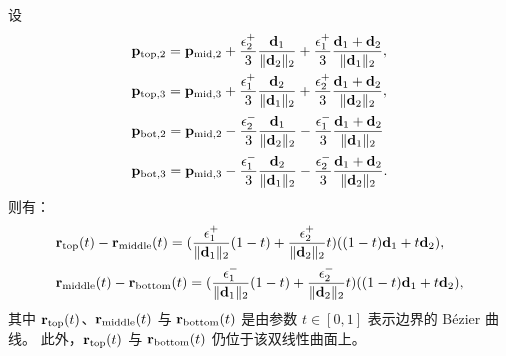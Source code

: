 \begin{proposition}\label{prop:mid2topbase}
    设
    \begin{align*}
       & \mathbf{p}_{\text{top},2} = \mathbf{p}_{\text{mid},2} + \frac{\epsilon_2^{+}}{3} \frac{\mathbf{d}_1}{\|\mathbf{d}_2\|_2} + \frac{\epsilon_1^{+}}{3}\frac{\mathbf{d}_1+\mathbf{d}_2}{\|\mathbf{d}_1\|_2}, \\
       &\mathbf{p}_{\text{top},3} = \mathbf{p}_{\text{mid},3} + \frac{\epsilon_1^{+}}{3} \frac{\mathbf{d}_2}{\|\mathbf{d}_1\|_2} + \frac{\epsilon_2^{+}}{3}\frac{\mathbf{d}_1+\mathbf{d}_2}{\|\mathbf{d}_2\|_2}, \\
       & \mathbf{p}_{\text{bot},2} = \mathbf{p}_{\text{mid},2} - \frac{\epsilon_2^{-}}{3} \frac{\mathbf{d}_1}{\|\mathbf{d}_2\|_2} - \frac{\epsilon_1^{-}}{3}\frac{\mathbf{d}_1+\mathbf{d}_2}{\|\mathbf{d}_1\|_2} \\
       & \mathbf{p}_{\text{bot},3} =\mathbf{p}_{\text{mid},3} - \frac{\epsilon_1^{-}}{3} \frac{\mathbf{d}_2}{\|\mathbf{d}_1\|_2} - \frac{\epsilon_2^{-}}{3}\frac{\mathbf{d}_1+\mathbf{d}_2}{\|\mathbf{d}_2\|_2}.
    \end{align*}
    则有：
    \begin{align*}
       & \mathbf{r}_\text{top}(t) - \mathbf{r}_\text{middle}(t) = (\frac{\epsilon_1^{+}}{\|\mathbf{d}_1\|_2}(1-t)+\frac{\epsilon_2^{+}}{\|\mathbf{d}_2\|_2}t)((1-t)\mathbf{d}_1 + t\mathbf{d}_2), \\
       &\mathbf{r}_\text{middle}(t) - \mathbf{r}_\text{bottom}(t) = (\frac{\epsilon_1^{-}}{\|\mathbf{d}_1\|_2}(1-t)+\frac{\epsilon_2^{-}}{\|\mathbf{d}_2\|_2}t)((1-t)\mathbf{d}_1 + t\mathbf{d}_2),
    \end{align*}
    其中 $\mathbf{r}_\text{top}(t)$、$\mathbf{r}_\text{middle}(t)$ 与 $\mathbf{r}_\text{bottom}(t)$ 是由参数 $t \in [0,1]$ 表示边界的 B\'{e}zier 曲线。
    此外，$\mathbf{r}_\text{top}(t)$ 与 $\mathbf{r}_\text{bottom}(t)$ 仍位于该双线性曲面上。
\end{proposition}
